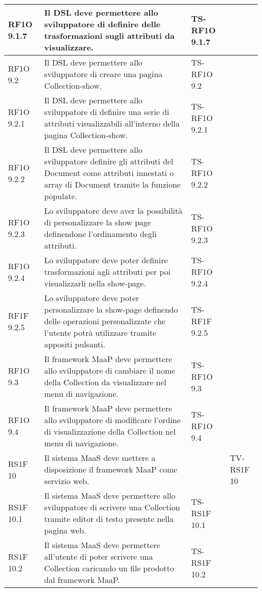 \begin{center}
\begin{longtable}{| p{2cm} | p{6cm} | p{2.5cm} | p{2.5cm} | }
        RF1O 9.1.7 & 
        Il DSL deve permettere allo sviluppatore di definire delle trasformazioni sugli attributi da visualizzare. & TS-RF1O 9.1.7 & \\ \hline 
        RF1O 9.2 & 
        Il DSL deve permettere allo sviluppatore di creare una pagina Collection-show. & TS-RF1O 9.2 & \\ \hline 
        RF1O 9.2.1 & 
        Il DSL deve permettere allo sviluppatore di definire una serie di attributi visualizzabili all’interno della pagina Collection-show. & TS-RF1O 9.2.1 & \\ \hline 
        RF1O 9.2.2 & 
        Il DSL deve permettere allo sviluppatore definire gli attributi del Document come attributi innestati o array di Document tramite la funzione populate. & TS-RF1O 9.2.2 & \\ \hline 
        RF1O 9.2.3 & 
        Lo sviluppatore deve aver la possibilità di personalizzare la show page definendone l’ordinamento degli attributi. & TS-RF1O 9.2.3 & \\ \hline 
        RF1O 9.2.4 & 
        Lo sviluppatore deve poter definire trasformazioni agli attributi per poi visualizzarli nella show-page. & TS-RF1O 9.2.4 & \\ \hline 
        RF1F 9.2.5 & 
        Lo sviluppatore deve poter personalizzare la show-page definendo delle operazioni personalizzate che l’utente potrà utilizzare tramite appositi pulsanti. & TS-RF1F 9.2.5 & \\ \hline 
        RF1O 9.3 & 
        Il framework MaaP deve permettere allo sviluppatore di cambiare il nome della Collection da visualizzare nel menu di navigazione. & TS-RF1O 9.3 & \\ \hline 
        RF1O 9.4 & 
        Il framework MaaP deve permettere allo sviluppatore di modificare l’ordine di visualizzazione della Collection nel menu di navigazione. & TS-RF1O 9.4 & \\ \hline 
        RS1F 10 & 
        Il sistema MaaS deve mettere a disposizione il framework MaaP come servizio web. &  & TV-RS1F 10 \\ \hline 
        RS1F 10.1 & 
        Il sistema MaaS deve permettere allo sviluppatore di scrivere una Collection tramite editor di testo presente nella pagina web. & TS-RS1F 10.1 & \\ \hline 
        RS1F 10.2 & 
        Il sistema MaaS deve permettere all’utente di poter scrivere una Collection caricando un file prodotto dal framework MaaP. & TS-RS1F 10.2 & \\ \hline 

\end{longtable}
\end{center}
